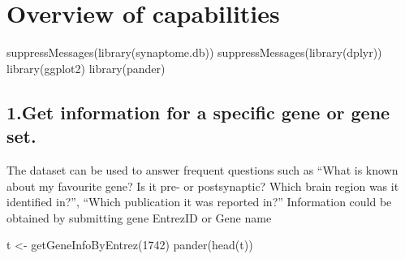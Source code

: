 \documentclass[
]{article}
\newenvironment{Shaded}{\begin{snugshade}}{\end{snugshade}}
\newcommand{\DecValTok}[1]{\textcolor[rgb]{0.00,0.00,0.81}{#1}}
\newcommand{\FunctionTok}[1]{\textcolor[rgb]{0.00,0.00,0.00}{#1}}
\newcommand{\NormalTok}[1]{#1}
\newcommand{\OtherTok}[1]{\textcolor[rgb]{0.56,0.35,0.01}{#1}}
\begin{document}
\hypertarget{overview-of-capabilities}{%
\section{Overview of capabilities}\label{overview-of-capabilities}}

\begin{Shaded}
\begin{Highlighting}[]
\FunctionTok{suppressMessages}\NormalTok{(}\FunctionTok{library}\NormalTok{(synaptome.db))}
\FunctionTok{suppressMessages}\NormalTok{(}\FunctionTok{library}\NormalTok{(dplyr))}
\FunctionTok{library}\NormalTok{(ggplot2)}
\FunctionTok{library}\NormalTok{(pander)}
\end{Highlighting}
\end{Shaded}

\hypertarget{get-information-for-a-specific-gene-or-gene-set.}{%
\subsection{1.Get information for a specific gene or gene
set.}\label{get-information-for-a-specific-gene-or-gene-set.}}

The dataset can be used to answer frequent questions such as ``What is
known about my favourite gene? Is it pre- or postsynaptic? Which brain
region was it identified in?'', ``Which publication it was reported
in?'' Information could be obtained by submitting gene EntrezID or Gene
name

\begin{Shaded}
\begin{Highlighting}[]
\NormalTok{t }\OtherTok{\textless{}{-}} \FunctionTok{getGeneInfoByEntrez}\NormalTok{(}\DecValTok{1742}\NormalTok{) }
\FunctionTok{pander}\NormalTok{(}\FunctionTok{head}\NormalTok{(t))}
\end{Highlighting}
\end{Shaded}
\end{document}
